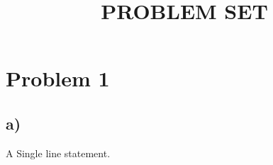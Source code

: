 \documentclass{article}
\title{\Huge PROBLEM SET}
\begin{document}
\maketitle

\renewcommand{\thesubsection}{\thesection.\alph{subsection}}
\section{Problem 1}


\begin{minipage}{.8\textwidth}%
\subsection*{a)}


\end{minipage}

\hspace*{1cm}%
\begin{minipage}{.8\textwidth}%
    A Single line statement.
\end{minipage}%
\end{document}
